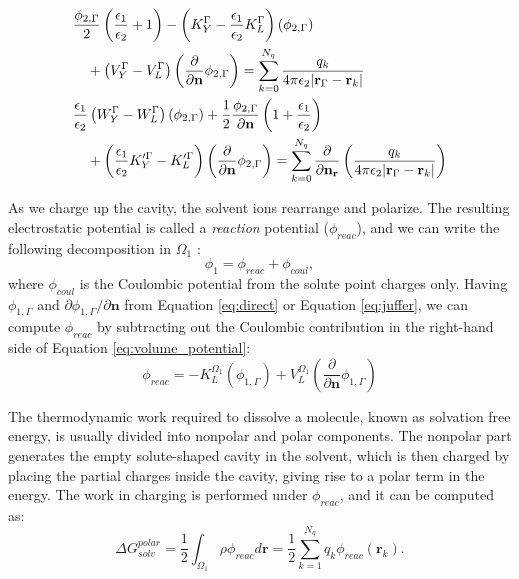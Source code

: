 \begin{align}\label{eq:lu}
    &\begin{multlined}[t][0.48\textwidth] \frac{\phi_{2,\Gamma}}{2}\left(\frac{\epsilon_1}{\epsilon_2}+1\right) - \left(K_Y^\Gamma - \frac{\epsilon_1}{\epsilon_2}K_L^\Gamma\right)(\phi_{2,\Gamma}) \\
    + \left(V_Y^\Gamma - V_L^\Gamma\right)\left( \frac{\partial}{\partial \mathbf{n}} \phi_{2,\Gamma} \right) = \sum_{k=0}^{N_q}  \frac{q_k}{4\pi\epsilon_2|\mathbf{r}_{\Gamma} - \mathbf{r}_k|}
    \end{multlined} \nonumber \\
    &\begin{multlined}[t][0.48\textwidth] \frac{\epsilon_1}{\epsilon_2}\left(W_Y^\Gamma - W_L^\Gamma\right)(\phi_{2,\Gamma}) +  \frac{1}{2}\frac{\phi_{2,\Gamma}}{\partial\mathbf{n}}\left(1+\frac{\epsilon_1}{\epsilon_2}\right) \\
    + \left(\frac{\epsilon_1}{\epsilon_2}K_Y^{\prime\Gamma} - K_L^{\prime\Gamma}\right)\left( \frac{\partial}{\partial \mathbf{n}} \phi_{2,\Gamma} \right) = \sum_{k=0}^{N_q}  \frac{\partial}{\partial\mathbf{n}_\mathbf{r}}\left(\frac{q_k}{4\pi\epsilon_2|\mathbf{r}_{\Gamma} - \mathbf{r}_k|}\right)
    \end{multlined}
\end{align}

As we charge up the cavity, the solvent ions rearrange and polarize.
The resulting electrostatic potential is called a \emph{reaction} potential ($\phi_{reac}$), and we can write the following decomposition in $\Omega_1$ :
%
\begin{equation}
\phi_1 = \phi_{reac} + \phi_{coul},
\end{equation}
%
where $\phi_{coul}$ is the Coulombic potential from the solute point charges only.
Having $\phi_{1,\Gamma}$ and $\partial\phi_{1,\Gamma}/\partial\mathbf{n}$ from Equation \eqref{eq:direct} or Equation \eqref{eq:juffer}, we can compute $\phi_{reac}$ by subtracting out the Coulombic contribution in the right-hand side of Equation \eqref{eq:volume_potential}:
%
\begin{equation}\label{eq:phi_reac}
\phi_{reac} = -K_{L}^{\Omega_1}(\phi_{1,\Gamma}) +  V_{L}^{\Omega_1} \left(\frac{\partial}{\partial \mathbf{n}}  \phi_{1,\Gamma}  \right) 
\end{equation}

The thermodynamic work required to dissolve a molecule, known as solvation free energy, is usually divided into nonpolar and polar components.
The nonpolar part generates the empty solute-shaped cavity in the solvent, which is then charged by placing the partial charges inside the cavity, giving rise to a polar term in the energy. 
The work in charging is performed under $\phi_{reac}$, and it can be computed as:
%
\begin{equation} \label{eq:energy}
\Delta G^{polar}_{solv} = \frac{1}{2}\int_{\Omega_1} \rho\phi_{reac}d\mathbf{r} = \frac{1}{2}\sum_{k=1}^{N_q}q_k\phi_{reac}(\mathbf{r}_k).
\end{equation}

